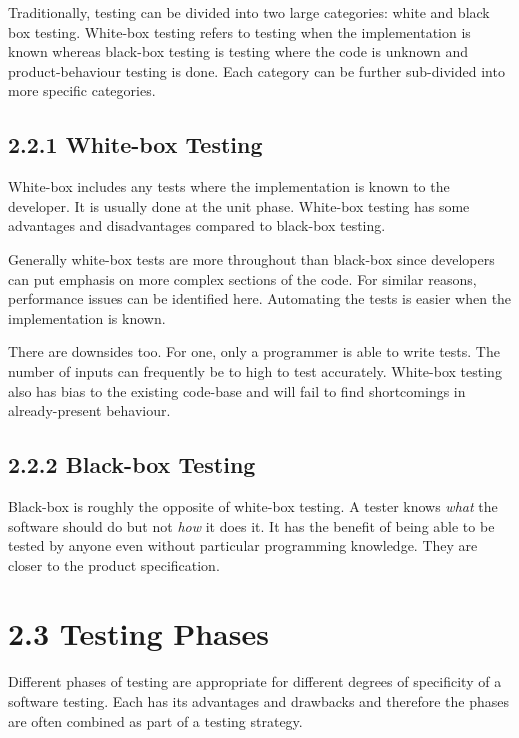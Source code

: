 \documentclass[12pt]{report}
\begin{document}
Traditionally, testing can be divided into two large categories: white and black box testing. White-box testing refers to testing when the implementation is known whereas black-box testing is testing where the code is unknown and product-behaviour testing is done. Each category can be further sub-divided into more specific categories.

\subsection*{2.2.1 White-box Testing}
\par\noindent
White-box includes any tests where the implementation is known to the developer. It is usually done at the unit phase. White-box testing has some advantages and disadvantages compared to black-box testing.

\par\noindent
Generally white-box tests are more throughout than black-box since developers can put emphasis on more complex sections of the code. For similar reasons, performance issues can be identified here. Automating the tests is easier when the implementation is known.

\par\noindent
There are downsides too. For one, only a programmer is able to write tests. The number of inputs can frequently be to high to test accurately. White-box testing also has bias to the existing code-base and will fail to find shortcomings in already-present behaviour.


\subsection*{2.2.2 Black-box Testing}
\par\noindent
Black-box is roughly the opposite of white-box testing. A tester knows \textit{what} the software should do but not \textit{how} it does it. It has the benefit of being able to be tested by anyone even without particular programming knowledge. They are closer to the product specification.

\section*{2.3 Testing Phases}
\par\noindent
Different phases of testing are appropriate for different degrees of specificity of a software testing. Each has its advantages and drawbacks and therefore the phases are often combined as part of a testing strategy.\\
\end{document}

